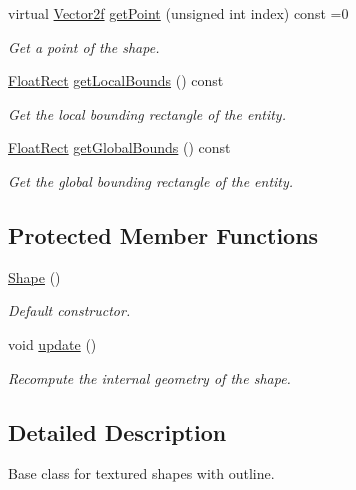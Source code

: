 \begin{DoxyCompactItemize}
virtual \hyperlink{classsf_1_1_vector2}{Vector2f} \hyperlink{classsf_1_1_shape_a397f3b4cdb7ad98cdc6c034816c652d2}{get\+Point} (unsigned int index) const =0
\begin{DoxyCompactList}\small\item\em Get a point of the shape. \end{DoxyCompactList}\item 
\hyperlink{classsf_1_1_rect}{Float\+Rect} \hyperlink{classsf_1_1_shape_a5d26a18ccfe850ff8d327ca97edbc34a}{get\+Local\+Bounds} () const 
\begin{DoxyCompactList}\small\item\em Get the local bounding rectangle of the entity. \end{DoxyCompactList}\item 
\hyperlink{classsf_1_1_rect}{Float\+Rect} \hyperlink{classsf_1_1_shape_a5257341fe832884dbba6b9dc855e33cc}{get\+Global\+Bounds} () const 
\begin{DoxyCompactList}\small\item\em Get the global bounding rectangle of the entity. \end{DoxyCompactList}\end{DoxyCompactItemize}
\subsection*{Protected Member Functions}
\begin{DoxyCompactItemize}
\item 
\hypertarget{classsf_1_1_shape_a413a457f720835b9f5d8e97ca8b80960}{\hyperlink{classsf_1_1_shape_a413a457f720835b9f5d8e97ca8b80960}{Shape} ()}\label{classsf_1_1_shape_a413a457f720835b9f5d8e97ca8b80960}

\begin{DoxyCompactList}\small\item\em Default constructor. \end{DoxyCompactList}\item 
void \hyperlink{classsf_1_1_shape_adfb2bd966c8edbc5d6c92ebc375e4ac1}{update} ()
\begin{DoxyCompactList}\small\item\em Recompute the internal geometry of the shape. \end{DoxyCompactList}\end{DoxyCompactItemize}


\subsection{Detailed Description}
Base class for textured shapes with outline. 

